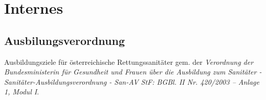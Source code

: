 \chapter{Internes}
\label{chp:INT}

\section{Ausbilungsverordnung}

Ausbildungsziele für österreichische Rettungssanitäter gem. der \emph{Verordnung
der Bundesministerin für Gesundheit und Frauen über die Ausbildung zum
Sanitäter - Sanitäter-Ausbildungsverordnung - San-AV StF: BGBl. II Nr. 420/2003
-- Anlage 1, Modul I}.

\tablelasttail{\bottomrule}


